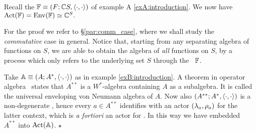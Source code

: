 \begin{exA} \label{exA:comm_case}
  Recall the \context\/ $\mathbb{F} \equiv (F; \mathbb{C} S, \langle\cdot, \cdot\rangle)$ of example
  {\rm A \ref{exA:introduction}}\@.
  We now have  ${\rm Act}(\mathbb{F}) = {\rm Env}(\mathbb{F}) \simeq \mathbb{C}^S.$
\end{exA}

For the proof we refer to \S\ref{par:comm_case}, where we shall study the {\em commutative\/}
case in general. Notice that, starting from any separating algebra of functions on $S$,
we are able to obtain the algebra of {\em all\/} functions on $S$,
by a process which only refers to the underlying set $S$ through the \context\ $\mathbb{F}$\@.




\begin{exB} \label{exB:univ_env_vNa} \rm
  Take $\mathbb{A} \equiv (A; A^*, \langle\cdot, \cdot\rangle)$ as in example \ref{exB:introduction}\@.
  A theorem in operator algebra \cite[\S III.2]{Takesaki}\ states that $A^{**}$
  is a $W^*$-algebra containing $A$ as a subalgebra.
  It is called the universal enveloping von Neumann algebra of $A$\@.
  Now also $(A^{**}; A^*, \langle\cdot, \cdot\rangle)$ is a non-degenerate \context, hence every $a\in A^{**}$
  identifies with an actor $(\lambda_a,\rho_a)$ for the latter context, which is {\em a fortiori\/}
  an actor for \Aa\@. In this way we have embedded $A^{**}$ into $\mbox{\rm Act}(\mathbb{A})$.
  \hfill $\star$
\end{exB}
